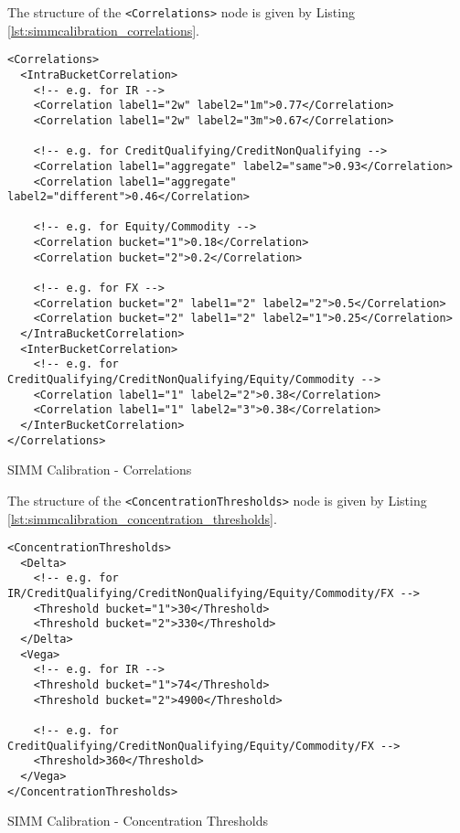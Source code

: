 The structure of the {\tt <Correlations>} node is given by Listing \ref{lst:simmcalibration_correlations}.

\begin{listing}[H]
\begin{verbatim}
<Correlations>
  <IntraBucketCorrelation>
    <!-- e.g. for IR -->
    <Correlation label1="2w" label2="1m">0.77</Correlation>
    <Correlation label1="2w" label2="3m">0.67</Correlation>

    <!-- e.g. for CreditQualifying/CreditNonQualifying -->
    <Correlation label1="aggregate" label2="same">0.93</Correlation>
    <Correlation label1="aggregate" label2="different">0.46</Correlation>

    <!-- e.g. for Equity/Commodity -->
    <Correlation bucket="1">0.18</Correlation>
    <Correlation bucket="2">0.2</Correlation>

    <!-- e.g. for FX -->
    <Correlation bucket="2" label1="2" label2="2">0.5</Correlation>
    <Correlation bucket="2" label1="2" label2="1">0.25</Correlation>
  </IntraBucketCorrelation>
  <InterBucketCorrelation>
    <!-- e.g. for CreditQualifying/CreditNonQualifying/Equity/Commodity -->
    <Correlation label1="1" label2="2">0.38</Correlation>
    <Correlation label1="1" label2="3">0.38</Correlation>
  </InterBucketCorrelation>
</Correlations>
\end{verbatim}
\caption{SIMM Calibration - Correlations}
\label{lst:simmcalibration_correlations}
\end{listing}

The structure of the {\tt <ConcentrationThresholds>} node is given by Listing \ref{lst:simmcalibration_concentration_thresholds}.

\begin{listing}[H]
\begin{verbatim}
<ConcentrationThresholds>
  <Delta>
    <!-- e.g. for IR/CreditQualifying/CreditNonQualifying/Equity/Commodity/FX -->
    <Threshold bucket="1">30</Threshold>
    <Threshold bucket="2">330</Threshold>
  </Delta>
  <Vega>
    <!-- e.g. for IR -->
    <Threshold bucket="1">74</Threshold>
    <Threshold bucket="2">4900</Threshold>

    <!-- e.g. for CreditQualifying/CreditNonQualifying/Equity/Commodity/FX -->
    <Threshold>360</Threshold>
  </Vega>
</ConcentrationThresholds>
\end{verbatim}
\caption{SIMM Calibration - Concentration Thresholds}
\label{lst:simmcalibration_concentration_thresholds}
\end{listing}

